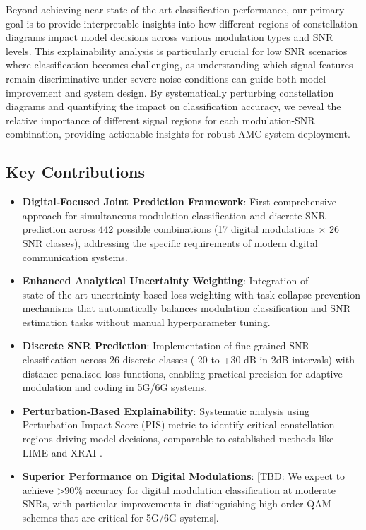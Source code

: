 \documentclass{ELSP}
\begin{document}
Beyond achieving near state-of-the-art classification performance, our primary goal is to provide interpretable insights into how different regions of constellation diagrams impact model decisions across various modulation types and SNR levels. This explainability analysis is particularly crucial for low SNR scenarios where classification becomes challenging, as understanding which signal features remain discriminative under severe noise conditions can guide both model improvement and system design. By systematically perturbing constellation diagrams and quantifying the impact on classification accuracy, we reveal the relative importance of different signal regions for each modulation-SNR combination, providing actionable insights for robust AMC system deployment.

\subsection*{Key Contributions}
\begin{itemize}
\item \textbf{Digital‑Focused Joint Prediction Framework}: First comprehensive approach for simultaneous modulation classification and discrete SNR prediction across 442 possible combinations (17 digital modulations × 26 SNR classes), addressing the specific requirements of modern digital communication systems.
\item \textbf{Enhanced Analytical Uncertainty Weighting}: Integration of state‑of‑the‑art uncertainty‑based loss weighting with task collapse prevention mechanisms that automatically balances modulation classification and SNR estimation tasks without manual hyperparameter tuning.
\item \textbf{Discrete SNR Prediction}: Implementation of fine‑grained SNR classification across 26 discrete classes (-20 to +30 dB in 2dB intervals) with distance‑penalized loss functions, enabling practical precision for adaptive modulation and coding in 5G/6G systems.
\item \textbf{Perturbation‑Based Explainability}: Systematic analysis using Perturbation Impact Score (PIS) metric to identify critical constellation regions driving model decisions, comparable to established methods like LIME \cite{10.1145/2939672.2939778} and XRAI \cite{kapishnikov2019xrai}.
\item \textbf{Superior Performance on Digital Modulations}: [TBD: We expect to achieve >90\% accuracy for digital modulation classification at moderate SNRs, with particular improvements in distinguishing high‑order QAM schemes that are critical for 5G/6G systems].
\end{itemize}
\end{document}
